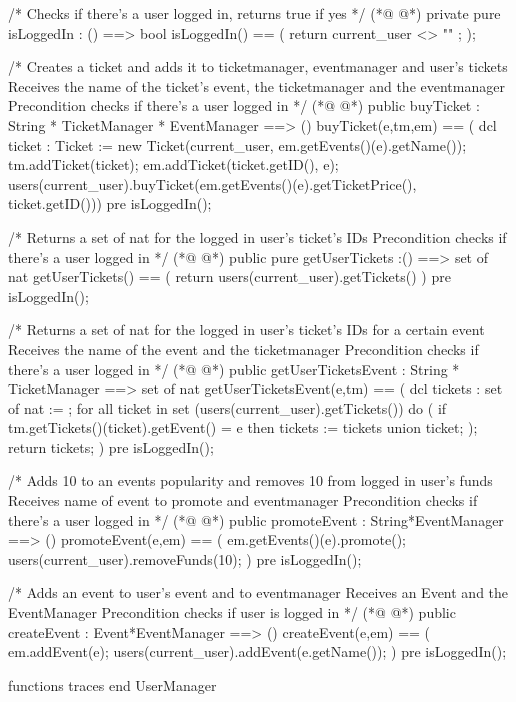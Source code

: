 \begin{vdmpp}[breaklines=true]
 /*
  Checks if there's a user logged in, returns true if yes
 */
(*@
\label{isLoggedIn:103}
@*)
 private pure isLoggedIn : () ==> bool
 isLoggedIn() == (
  return current_user <> "" ;
 );
 
 /*
  Creates a ticket and adds it to ticketmanager, eventmanager and user's tickets
  Receives the name of the ticket's event, the ticketmanager and the eventmanager
  Precondition checks if there's a user logged in
 */
(*@
\label{buyTicket:113}
@*)
 public buyTicket : String * TicketManager * EventManager ==> ()
 buyTicket(e,tm,em) == (
  dcl ticket : Ticket := new Ticket(current_user, em.getEvents()(e).getName());
  tm.addTicket(ticket);
  em.addTicket(ticket.getID(), e);
  users(current_user).buyTicket(em.getEvents()(e).getTicketPrice(), ticket.getID()))
 pre isLoggedIn();
 
 /*
  Returns a set of nat for the logged in user's ticket's IDs
  Precondition checks if there's a user logged in
 */
(*@
\label{getUserTickets:125}
@*)
 public pure getUserTickets :() ==> set of nat
 getUserTickets() == (
  return users(current_user).getTickets()
 )
 pre isLoggedIn();
 
 /*
  Returns a set of nat for the logged in user's ticket's IDs for a certain event
  Receives the name of the event and the ticketmanager
  Precondition checks if there's a user logged in
 */
(*@
\label{getUserTicketsEvent:136}
@*)
 public getUserTicketsEvent : String * TicketManager ==> set of nat
 getUserTicketsEvent(e,tm) == (
  dcl tickets : set of nat := {};
  for all ticket in set (users(current_user).getTickets()) do 
  (
   if tm.getTickets()(ticket).getEvent() = e
    then tickets := tickets union {ticket};
  );
  return tickets;
 )
 pre isLoggedIn();
 
 /*
  Adds 10 to an events popularity and removes 10 from logged in user's funds
  Receives name of event to promote and eventmanager
  Precondition checks if there's a user logged in
 */
(*@
\label{promoteEvent:153}
@*)
 public promoteEvent : String*EventManager ==> ()
 promoteEvent(e,em) == (
  em.getEvents()(e).promote();
  users(current_user).removeFunds(10);
 )
 pre isLoggedIn();
 
 /*
  Adds an event to user's event and to eventmanager
  Receives an Event and the EventManager
  Precondition checks if user is logged in
 */
(*@
\label{createEvent:165}
@*)
 public createEvent : Event*EventManager ==> ()
 createEvent(e,em) == (
  em.addEvent(e);
  users(current_user).addEvent(e.getName());
 )
 pre isLoggedIn();

functions
traces
end UserManager
\end{vdmpp}
